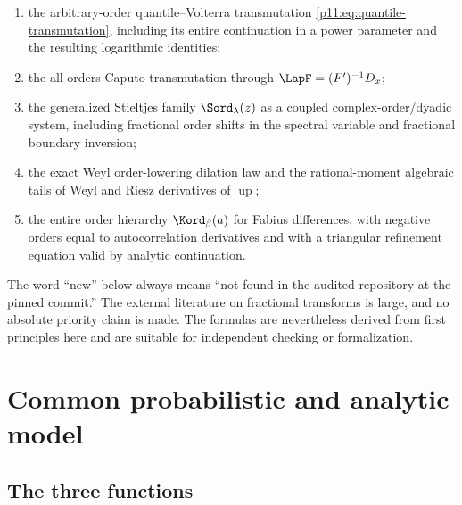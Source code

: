\documentclass[11pt,oneside]{article}
\theoremstyle{definition}
\theoremstyle{remark}
\newcommand{\Up}{\operatorname{up}}
\newcommand{\1}{\mathbf 1}
\begin{document}
\begin{enumerate}
\item the arbitrary-order quantile--Volterra transmutation
      \eqref{p11:eq:quantile-transmutation}, including its entire continuation in
      a power parameter and the resulting logarithmic identities;
\item the all-orders Caputo transmutation through
      $\LapF=(F')^{-1}D_x$;
\item the generalized Stieltjes family $\Sord_\lambda(z)$ as a coupled
      complex-order/dyadic system, including fractional order shifts in the
      spectral variable and fractional boundary inversion;
\item the exact Weyl order-lowering dilation law and the rational-moment
      algebraic tails of Weyl and Riesz derivatives of $\Up$;
\item the entire order hierarchy $\Kord_\beta(a)$ for Fabius differences,
      with negative orders equal to autocorrelation derivatives and with a
      triangular refinement equation valid by analytic continuation.
\end{enumerate}

\begin{warning}
The word ``new'' below always means ``not found in the audited repository at
the pinned commit.''  The external literature on fractional transforms is
large, and no absolute priority claim is made.  The formulas are nevertheless
derived from first principles here and are suitable for independent checking
or formalization.
\end{warning}

\section{Common probabilistic and analytic model}
\label{p11:sec:model}

\subsection{The three functions}
\end{document}
